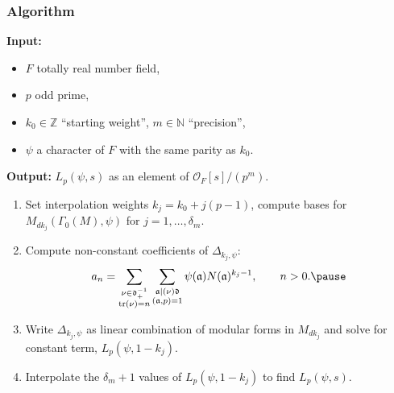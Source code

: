 \documentclass[10pt]{beamer}
\let\mf\mathfrak
\newcommand{\N}{\mathbb{N}}
\newcommand{\Z}{\mathbb{Z}}
\renewcommand{\O}{\mathscr{O}}
\begin{document}
\begin{frame}
  \frametitle{Algorithm}\pause
  \textbf{Input:}\pause
  \begin{itemize}[itemsep=0pt,leftmargin=2pt]
  \item $F$ totally real number field,\pause
  \item $p$ odd prime,\pause
  \item $k_0 \in \Z $ ``starting weight'', $m \in \N$ ``precision'',\pause
  \item  $\psi$ a character of $F$ with the same parity as $k_{0}$. \pause
  \end{itemize}

 \textbf{Output:} $L_p(\psi,s)$ as an element of $\O_{F}[s]/(p^m)$. \pause

 \begin{enumerate}[leftmargin=2pt]
 \item Set interpolation weights $k_{j} = k_{0} + j(p-1)$, \pause  compute
   bases for $M_{dk_{j}}(\Gamma_{0}(M),\psi)$ for $j =1, \ldots ,\delta_{m}$.\pause
 \item Compute non-constant coefficients of $\Delta_{k_{j},\psi}$:
   \[ a_{n} =\sum_{\substack{ \nu \in \mf
      d^{-1}_{+}\\ \tr(\nu) = n}}\sum_{\substack{\mf a \mid (\nu)\mf d \\ (\mf a, p) =
        1}}\psi(\mf a)N(\mf a)^{k_{j}-1}, \qq{} n>0. \pause
   \]
 \item Write $\Delta_{k_{j},\psi}$ as linear combination of modular forms in
   $M_{dk_{j}}$ and solve for constant term, $L_{p}(\psi,1-k_{j})$. \pause
 \item Interpolate the $\delta_{m}+1$ values of $L_{p}(\psi,1-k_{j})$ to find
   $L_{p}(\psi,s)$.
 \end{enumerate}

\end{frame}
\end{document}
